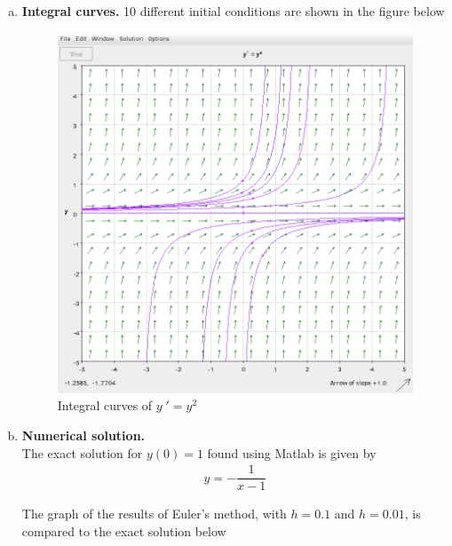 \documentclass[a4paper,12pt]{article}
\begin{document}
\begin{enumerate}[I.]
\begin{enumerate}[a)]
    \item \textbf{Integral curves.} 10 different initial conditions are shown in the figure below
        \begin{figure}[H]
      \begin{center}
        \includegraphics[scale=.3]{22.png}
        \caption{Integral curves of $y\;' = y^2$}
        \label{fig:4}
      \end{center}
    \end{figure}
    \item \textbf{Numerical solution.} \\

      The exact solution for $y(0)=1$ found using Matlab is given by
      \begin{align*}
        y=- \dfrac{1}{x-1}
      \end{align*}

      The graph of the results of Euler's method, with $h=0.1$ and $h=0.01$, is compared to the exact solution below
      

\end{enumerate}
\end{enumerate}
\end{document}
